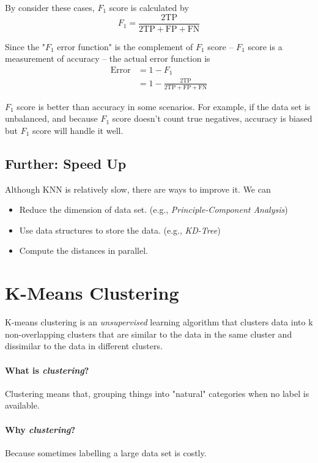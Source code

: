 \documentclass{note}
\begin{document}
By consider these cases, $F_1$ score is calculated by
$$
F_1 = \frac{2\text{TP}}{2\text{TP} + \text{FP} + \text{FN}}
$$

Since the "$F_1$ error function" is the complement of $F_1$ score -- $F_1$ score is a measurement of accuracy -- the actual error function is 
\begin{align*}
    \text{Error} 
    &= 1 - F_1 \\
    &= 1 - \frac{2\text{TP}}{2\text{TP} + \text{FP} + \text{FN}}
\end{align*}

\begin{note}
    $F_1$ score is better than accuracy in some scenarios. For example, if the data set is unbalanced, and because $F_1$ score doesn't count true negatives, accuracy is biased but $F_1$ score will handle it well. 
\end{note}

\subsection{Further: Speed Up}

Although KNN is relatively slow, there are ways to improve it. We can
\begin{itemize}
    \item Reduce the dimension of data set. (e.g., \textit{Principle-Component Analysis})
    \item Use data structures to store the data. (e.g., \textit{KD-Tree})
    \item Compute the distances in parallel.
\end{itemize}

\section{K-Means Clustering}

K-means clustering is an \textit{unsupervised} learning algorithm that clusters data into k non-overlapping clusters that are similar to the data in the same cluster and dissimilar to the data in different clusters.

\paragraph{What is \textit{clustering}?}
Clustering means that, grouping things into "natural" categories when no label is available.

\paragraph{Why \textit{clustering}?}
Because sometimes labelling a large data set is costly.
\end{document}
